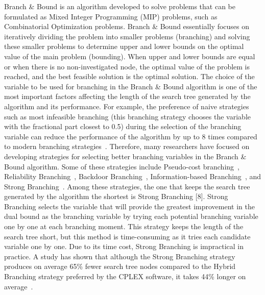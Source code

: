 Branch \& Bound is an algorithm developed to solve problems that can be formulated as Mixed Integer Programming (MIP) problems, such as Combinatorial Optimization problems.
Branch \& Bound essentially focuses on iteratively dividing the problem into smaller problems (branching) and solving these smaller problems to determine upper and lower bounds on the optimal value of the main problem (bounding).
When upper and lower bounds are equal or when there is no non-investigated node, the optimal value of the problem is reached, and the best feasible solution is the optimal solution.
The choice of the variable to be used for branching in the Branch \& Bound algorithm is one of the most important factors affecting the length of the search tree generated by the algorithm and its performance.
For example, the preference of naive strategies such as most infeasible branching (this branching strategy chooses the variable with the fractional part closest to 0.5) during the selection of the branching variable can reduce the performance of the algorithm by up to 8 times compared to modern branching strategies~\cite{achterberg_mixed_2013}.
Therefore, many researchers have focused on developing strategies for selecting better branching variables in the Branch \& Bound algorithm.
Some of these strategies include Pseudo-cost branching~\cite{benichou_experiments_1971}, Reliability Branching~\cite{achterbergBranchingRulesRevisited2005}, Backdoor Branching~\cite{fischettiBackdoorBranching2011}, Information-based Branching~\cite{kilinckarzanInformationbasedBranchingSchemes2009}, and Strong Branching~\cite{applegateFindingCutsTSP1995}.
Among these strategies, the one that keeps the search tree generated by the algorithm the shortest is Strong Branching [8].
Strong Branching selects the variable that will provide the greatest improvement in the dual bound as the branching variable by trying each potential branching variable one by one at each branching moment.
This strategy keeps the length of the search tree short, but this method is time-consuming as it tries each candidate variable one by one.
Due to its time cost, Strong Branching is impractical in practice.
A study has shown that although the Strong Branching strategy produces on average 65\% fewer search tree nodes compared to the Hybrid Branching strategy preferred by the CPLEX software, it takes 44\% longer on average~\cite{DBLP:phd/de/Achterberg2007}.


